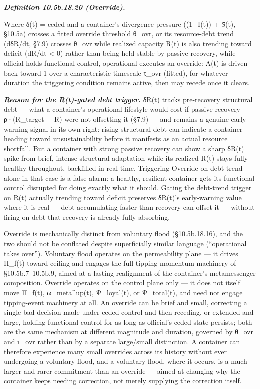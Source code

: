 \documentclass[
]{article}
\begin{document}
\emph{\textbf{Definition 10.5b.18.20 (Override).}}

Where δ(t) = ceded and a container's divergence pressure ((1−I(t)) +
S̃(t), §10.5a) crosses a fitted override threshold θ\_ovr, or its
resource-debt trend (dδR/dt, §7.9) crosses θ\_ovr while realized
capacity R(t) is also trending toward deficit (dR/dt \textless{} 0)
rather than being held stable by passive recovery, while official holds
functional control, operational executes an override: A(t) is driven
back toward 1 over a characteristic timescale τ\_ovr (fitted), for
whatever duration the triggering condition remains active, then may
recede once it clears.

\emph{\textbf{Reason for the R(t)-gated debt trigger.}} δR(t) tracks
pre-recovery structural debt --- what a container's operational
lifestyle would cost if passive recovery ρ·(R\_target − R) were not
offsetting it (§7.9) --- and remains a genuine early-warning signal in
its own right: rising structural debt can indicate a container heading
toward unsustainability before it manifests as an actual resource
shortfall. But a container with strong passive recovery can show a sharp
δR(t) spike from brief, intense structural adaptation while its realized
R(t) stays fully healthy throughout, backfilled in real time. Triggering
Override on debt-trend alone in that case is a false alarm: a healthy,
resilient container gets its functional control disrupted for doing
exactly what it should. Gating the debt-trend trigger on R(t) actually
trending toward deficit preserves δR(t)'s early-warning value where it
is real --- debt accumulating faster than recovery can offset it ---
without firing on debt that recovery is already fully absorbing.

Override is mechanically distinct from voluntary flood (§10.5b.18.16),
and the two should not be conflated despite superficially similar
language (``operational takes over''). Voluntary flood operates on the
permeability plane --- it drives Π\_f(t) toward ceiling and engages the
full tipping-momentum machinery of §10.5b.7--10.5b.9, aimed at a lasting
realignment of the container's metamessenger composition. Override
operates on the control plane only --- it does not itself move Π\_f(t),
ω\_meta\^{}up(t), Ψ\_loyal(t), or Ψ\_total(t), and need not engage
tipping-event machinery at all. An override can be brief and small,
correcting a single bad decision made under ceded control and then
receding, or extended and large, holding functional control for as long
as official's ceded state persists; both are the same mechanism at
different magnitude and duration, governed by θ\_ovr and τ\_ovr rather
than by a separate large/small distinction. A container can therefore
experience many small overrides across its history without ever
undergoing a voluntary flood, and a voluntary flood, where it occurs, is
a much larger and rarer commitment than an override --- aimed at
changing why the container keeps needing correction, not merely
supplying the correction itself.
\end{document}
